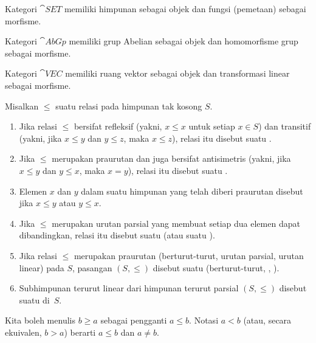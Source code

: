 \begin{exam} Kategori
$\cat{SET}$ memiliki himpunan sebagai objek dan fungsi (pemetaan) sebagai morfisme.
\end{exam}

\begin{exam} Kategori
$\cat{AbGp}$ memiliki grup Abelian sebagai objek dan homomorfisme grup sebagai morfisme.
\end{exam}

\begin{exam} Kategori
$\cat{VEC}$ memiliki ruang vektor sebagai objek dan transformasi linear sebagai morfisme.
\end{exam}







\begin{defn}\label{C008111} Misalkan $\le$ suatu relasi pada himpunan tak kosong $S$.
 \begin{enumerate}
  \item Jika relasi
 $\le$ bersifat refleksif (yakni, $x \le x$ untuk setiap $x \in S$) dan transitif (yakni, jika $x \le y$ dan $y \le z$, maka $x  \le z$), relasi itu disebut suatu
.
  \item Jika $\le$ merupakan praurutan dan juga bersifat antisimetris (yakni, jika $x \le y$ dan $y \le x$, maka $x = y$), relasi itu disebut suatu
.
  \item Elemen $x$ dan $y$ dalam suatu himpunan yang telah diberi praurutan disebut
 jika $x \le y$ atau $y \le x$.
  \item Jika $\le$ merupakan urutan parsial yang membuat setiap dua elemen dapat dibandingkan, relasi itu disebut suatu
 (atau suatu
).
  \item Jika relasi $\le$ merupakan praurutan (berturut-turut, urutan parsial,
urutan linear) pada $S$, pasangan $(S,\le)$ disebut suatu
 (berturut-turut,
,
).
  \item Subhimpunan terurut linear dari himpunan terurut parsial $(S,\le)$ disebut suatu
 di~$S$.
 \end{enumerate}
Kita boleh menulis $b \ge a$ sebagai pengganti $a \le b$. Notasi
$a < b$ (atau, secara ekuivalen, $b > a$) berarti $a \le b$ dan $a \ne b$.
\end{defn}

